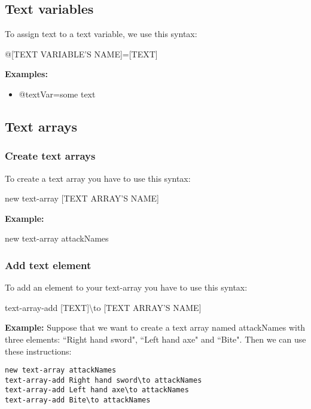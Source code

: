 \documentclass[11pt,a4paper,openright,oneside]{book}
\newenvironment{exs}
{
  \setlength{\parindent}{0cm}
  \large \textbf{Examples:} \normalsize
}
{}
\newenvironment{ex}
{
  \setlength{\parindent}{0cm}
  \large \textbf{Example:} \normalsize 
}
{}
\begin{document}
\subsection{Text variables}

To assign text to a text variable, we use this syntax:
\begin{center} \textsf{@\textsc{\scriptsize[TEXT VARIABLE'S NAME]}=\textsc{\scriptsize[TEXT]}} \normalsize \end{center}
\begin{exs}
  \begin{itemize}
    \item \textsf{@textVar=some text}
  \end{itemize}
\end{exs}

\subsection{Text arrays}

\subsubsection{Create text arrays}
To create a text array you have to use this syntax:
\begin{center} \textsf{new text-array \textsc{\scriptsize[TEXT ARRAY'S NAME]}} \normalsize \end{center}
\begin{ex} 
  new text-array attackNames
\end{ex}

\subsubsection{Add text element}
To add an element to your text-array you have to use this syntax:
\begin{center} \textsf{text-array-add \textsc{\scriptsize[TEXT]}\textbackslash to \textsc{\scriptsize[TEXT ARRAY'S NAME]}} \normalsize \end{center}
\begin{ex} Suppose that we want to create a text array named \textsf{attackNames} with three elements: \textsf{``Right hand sword", ``Left hand axe"} and \textsf{``Bite"}. Then we can use these instructions:
  \begin{lstlisting}
new text-array attackNames
text-array-add Right hand sword\to attackNames
text-array-add Left hand axe\to attackNames
text-array-add Bite\to attackNames
  \end{lstlisting}
\end{ex}
\end{document}
